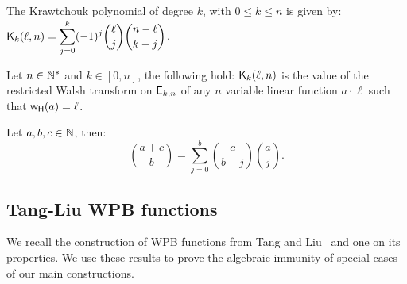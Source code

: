 \documentclass[11pt]{llncs}
\begin{document}
\begin{definition}\label{def:Kraw}
	The Krawtchouk polynomial of degree $k$, with $0\leq k\leq n$ is given by: $ \displaystyle \mathsf{K}_{k}(\ell,n)=\sum_{j=0}^{k} (-1)^j \binom{\ell}{j} \binom{n-\ell}{k-j}$. 
\end{definition}


\begin{Prop}\label{prop:Kr}
	Let $n\in \mathbb{N}^*$ and $k\in [0,n]$, the following hold:
 $\mathsf{K}_{k}(\ell,n)$ is the value of the restricted Walsh transform on $\mathsf{E}_{k,n}$ of any $n$ variable linear function $a\cdot \ell$ such that $\mathsf{w_H}(a)=\ell$.
\end{Prop}


\begin{Prop}\label{prop:Vandermonde}
	Let $a,b,c \in \mathbb{N}$, then:
	\begin{equation*}
	\binom{a+c}{b}=\sum_{j=0}^b\binom{c}{b-j}  \binom{a}{j}.
	\end{equation*}
\end{Prop}



\subsection{Tang-Liu WPB functions}

We recall the construction of WPB functions from Tang and Liu~\cite{CC:TangLiu19} and one on its properties. We use these results to prove the algebraic immunity of special cases of our main constructions.
\end{document}
